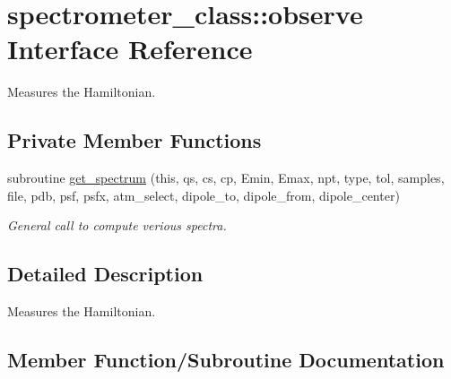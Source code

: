 \hypertarget{interfacespectrometer__class_1_1observe}{}\section{spectrometer\+\_\+class\+:\+:observe Interface Reference}
\label{interfacespectrometer__class_1_1observe}


Measures the Hamiltonian.  


\subsection*{Private Member Functions}
\begin{DoxyCompactItemize}
\item 
subroutine \hyperlink{interfacespectrometer__class_1_1observe_ab17bdd571e63c8de9fb5029c8af31967}{get\+\_\+spectrum} (this, qs, cs, cp, Emin, Emax, npt, type, tol, samples, file, pdb, psf, psfx, atm\+\_\+select, dipole\+\_\+to, dipole\+\_\+from, dipole\+\_\+center)
\begin{DoxyCompactList}\small\item\em General call to compute verious spectra. \end{DoxyCompactList}\end{DoxyCompactItemize}


\subsection{Detailed Description}
Measures the Hamiltonian. 

\subsection{Member Function/\+Subroutine Documentation}
\mbox{\label{interfacespectrometer__class_1_1observe_ab17bdd571e63c8de9fb5029c8af31967}} 
